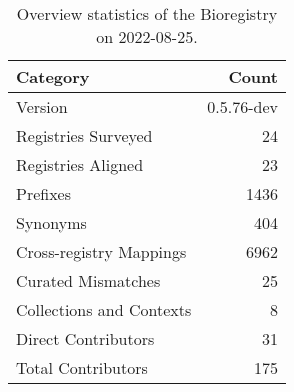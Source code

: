 \begin{table}
\centering
\caption{Overview statistics of the Bioregistry on 2022-08-25.}
\label{tab:bioregistry-summary}
\begin{tabular}{lr}
\toprule
                Category &      Count \\
\midrule
                 Version & 0.5.76-dev \\
     Registries Surveyed &         24 \\
      Registries Aligned &         23 \\
                Prefixes &       1436 \\
                Synonyms &        404 \\
 Cross-registry Mappings &       6962 \\
      Curated Mismatches &         25 \\
Collections and Contexts &          8 \\
     Direct Contributors &         31 \\
      Total Contributors &        175 \\
\bottomrule
\end{tabular}
\end{table}
